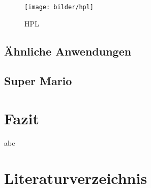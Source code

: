 \documentclass[a4paper,11pt]{scrartcl}
\begin{document}
\begin{figure}[h]
\begin{center}
\texttt{[image: bilder/hpl]}
\cite{OT-paper} \caption{HPL}
\end{center}
\end{figure}

\subsection{Ähnliche Anwendungen}

\subsection{Super Mario}


\section{Fazit}
abc


\section{Literaturverzeichnis}
\end{document}
